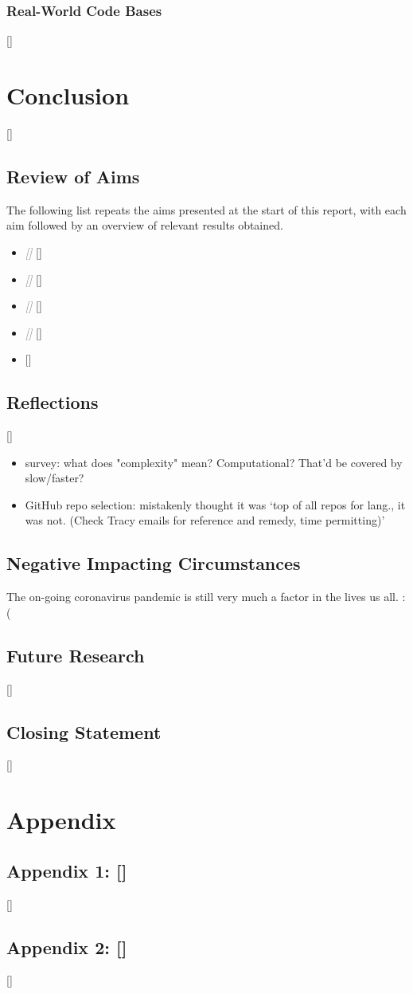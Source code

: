 \documentclass{article}
\begin{document}
        \subsubsection{Real-World Code Bases}
            []
\newpage
\section{Conclusion}
\label{sec:conclusion}
    []
    \subsection{Review of Aims}
        The following list repeats the aims presented at the start of this report, with each aim followed by an overview of relevant results obtained.
        \begin{itemize}
            \item \textcolor{gray}{\textit{[]}}
                []
            \item \textcolor{gray}{\textit{[]}}
                []
            \item \textcolor{gray}{\textit{[]}}
                []
            \item \textcolor{gray}{\textit{[]}}
                []
            \item \textcolor{gray}{\textit{}}
                []
        \end{itemize}
    \subsection{Reflections}
        []
        \begin{itemize}
            \item survey: what does "complexity" mean? Computational? That'd be covered by slow/faster?
            \item GitHub repo selection: mistakenly thought it was `top of all repos for lang., it was not. (Check Tracy emails for reference and remedy, time permitting)'
        \end{itemize}

        
    \subsection{Negative Impacting Circumstances}
        The on-going coronavirus pandemic is still very much a factor in the lives us all. :(
    \subsection{Future Research}
        []
    \subsection{Closing Statement}
        []

\newpage

\newpage
\section*{Appendix}
    \subsection*{Appendix 1: []}
        []
    \subsection*{Appendix 2: []}
        []
\end{document}
